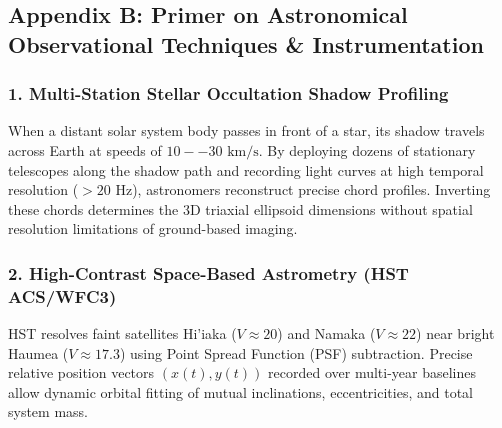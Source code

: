 \documentclass[11pt,a4paper]{article}
\begin{document}
\subsection*{Appendix B: Primer on Astronomical Observational Techniques \& Instrumentation}

\subsubsection*{1. Multi-Station Stellar Occultation Shadow Profiling}
When a distant solar system body passes in front of a star, its shadow travels across Earth at speeds of $10--30\text{ km/s}$. By deploying dozens of stationary telescopes along the shadow path and recording light curves at high temporal resolution ($>20\text{ Hz}$), astronomers reconstruct precise chord profiles. Inverting these chords determines the 3D triaxial ellipsoid dimensions without spatial resolution limitations of ground-based imaging.

\subsubsection*{2. High-Contrast Space-Based Astrometry (HST ACS/WFC3)}
HST resolves faint satellites Hi'iaka ($V \approx 20$) and Namaka ($V \approx 22$) near bright Haumea ($V \approx 17.3$) using Point Spread Function (PSF) subtraction. Precise relative position vectors $(x(t), y(t))$ recorded over multi-year baselines allow dynamic orbital fitting of mutual inclinations, eccentricities, and total system mass.
\end{document}
